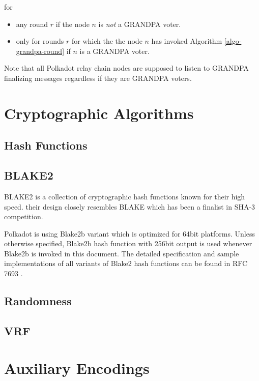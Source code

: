 \documentclass{book}
\newcommand{\tmem}[1]{{\em #1\/}}
\newenvironment{itemizedot}{\begin{itemize} \renewcommand{\labelitemi}{$\bullet$}\renewcommand{\labelitemii}{$\bullet$}\renewcommand{\labelitemiii}{$\bullet$}\renewcommand{\labelitemiv}{$\bullet$}}{\end{itemize}}
\begin{document}
for
\begin{itemizedot}
  \item any round $r$ if the node $n$ is {\tmem{not}} a GRANDPA voter.
  
  \item only for rounds $r$ for which the the node $n$ has invoked Algorithm
  \ref{algo-grandpa-round} if $n$ is a GRANDPA voter.
\end{itemizedot}
Note that all Polkadot relay chain nodes are supposed to listen to GRANDPA
finalizing messages regardless if they are GRANDPA
voters.\appendix\chapter{Cryptographic Algorithms}

\section{Hash Functions}\label{sect-hash-functions}

\section{BLAKE2}\label{sect-blake2}

BLAKE2 is a collection of cryptographic hash functions known for their high
speed. their design closely resembles BLAKE which has been a finalist in SHA-3
competition.

Polkadot is using Blake2b variant which is optimized for 64bit platforms.
Unless otherwise specified, Blake2b hash function with 256bit output is used
whenever Blake2b is invoked in this document. The detailed specification and
sample implementations of all variants of Blake2 hash functions can be found
in RFC 7693 {\cite{saarinen_blake2_2015}}.

\section{Randomness}\label{sect-randomness}

\section{VRF}\label{sect-vrf}

\chapter{Auxiliary Encodings}\label{sect-encoding}
\end{document}
